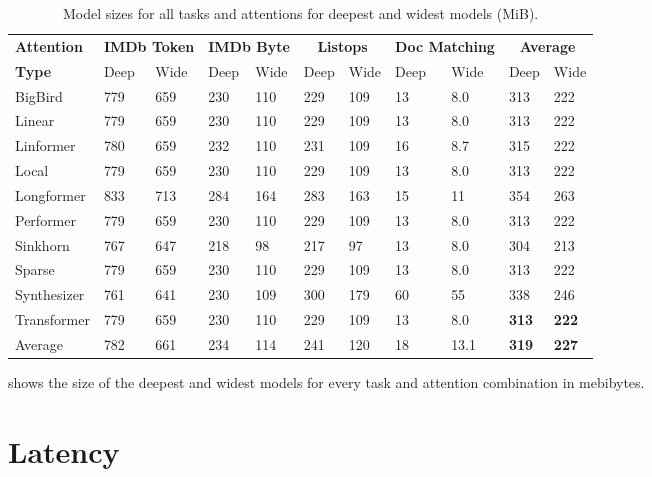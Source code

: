 \begin{table}[!h]
    \caption{Model sizes for all tasks and attentions for deepest and widest models (MiB).}
    \label{table:model_sizes}
    \begin{center}
        \begin{tabular}{l | l l l l l l l l | l l}
            \toprule
            {\bf Attention} & \multicolumn{2}{c}{\bf IMDb Token} & \multicolumn{2}{c}{\bf IMDb Byte} & \multicolumn{2}{c}{\bf Listops} & \multicolumn{2}{c}{\bf Doc Matching} & \multicolumn{2}{c}{\bf Average} \\
            {\bf Type} & Deep & Wide & Deep & Wide & Deep & Wide & Deep & Wide & Deep & Wide \\
            \midrule
BigBird     & 779 & 659 & 230 & 110 & 229 & 109 & 13 & 8.0 & 313 & 222 \\
Linear      & 779 & 659 & 230 & 110 & 229 & 109 & 13 & 8.0 & 313 & 222 \\
Linformer   & 780 & 659 & 232 & 110 & 231 & 109 & 16 & 8.7 & 315 & 222 \\
Local       & 779 & 659 & 230 & 110 & 229 & 109 & 13 & 8.0 & 313 & 222 \\
Longformer  & 833 & 713 & 284 & 164 & 283 & 163 & 15 & 11 & 354 & 263 \\
Performer   & 779 & 659 & 230 & 110 & 229 & 109 & 13 & 8.0 & 313 & 222 \\
Sinkhorn    & 767 & 647 & 218 & 98 & 217 & 97 & 13 & 8.0 & 304 & 213 \\
Sparse      & 779 & 659 & 230 & 110 & 229 & 109 & 13 & 8.0 & 313 & 222 \\
Synthesizer & 761 & 641 & 230 & 109 & 300 & 179 & 60 & 55 & 338 & 246 \\
Transformer & 779 & 659 & 230 & 110 & 229 & 109 & 13 & 8.0 & \textbf{313} & \textbf{222}  \\
\bottomrule
Average     & 782 & 661 & 234 & 114 & 241 & 120 & 18 & 13.1 & \textbf{319} & \textbf{227} \\
        \end{tabular}
    \end{center}
\end{table}

 shows the size of the deepest and widest models for every task and attention combination in mebibytes.


\section{Latency}\label{appendix:latency}

